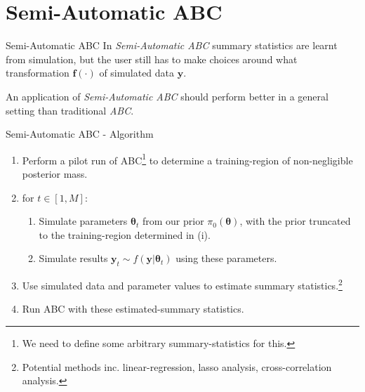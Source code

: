 \documentclass[11pt,a4paper]{article}
\begin{document}
\section*{Semi-Automatic ABC}

  \begin{definition}{Semi-Automatic ABC\cite{Constructing_Summary_Statistics_For_ABC}}
    In \textit{Semi-Automatic ABC} summary statistics are learnt from simulation, but the user still has to make choices around what transformation $\mathbf{f}(\cdot)$ of simulated data $\mathbf{y}$.
    \par An application of \textit{Semi-Automatic ABC} should perform better in a general setting than traditional \textit{ABC}.
  \end{definition}

  \begin{proposition}{Semi-Automatic ABC - Algorithm}
    \begin{enumerate}
      \item Perform a pilot run of ABC\footnote{We need to define some arbitrary summary-statistics for this.} to determine a training-region of non-negligible posterior mass.
      \item for $t\in[1,M]$:
      \begin{enumerate}
        \item Simulate parameters $\pmb\theta_t$ from our prior $\pi_0(\pmb\theta)$, with the prior truncated to the training-region determined in (i).
        \item Simulate results $\mathbf{y}_t\sim f(\mathbf{y}|\pmb\theta_t)$ using these parameters.
      \end{enumerate}
      \item Use simulated data and parameter values to estimate summary statistics.\footnote{Potential methods inc. linear-regression, lasso analysis, cross-correlation analysis.}
      \item Run ABC with these estimated-summary statistics.
    \end{enumerate}
  \end{proposition}
\end{document}
